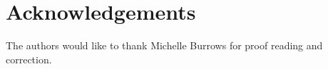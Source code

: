 \chapter{Acknowledgements}

The authors would like to thank Michelle Burrows for proof reading and
correction.
